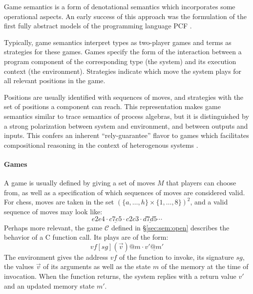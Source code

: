 \documentclass[sigplan,10pt,review,anonymous]{acmart}\settopmatter{printfolios=true,printccs=false,printacmref=false}
\begin{document}
Game semantics is a form of denotational semantics which
incorporates some operational aspects.
An early success of this approach was
the formulation of the first fully abstract models
of the programming language PCF \cite{pcfajm,pcfho}.

Typically,
game semantics interpret
types as two-player games
and terms as strategies for these games.
Games specify the form of the interaction
between a program component of the corresponding type
(the system)
and its execution context
(the environment).
Strategies
indicate which move the system plays
for all relevant positions in the game.

Positions are usually identified with sequences of moves,
and strategies with the set of positions
a component can reach.
This representation makes
game semantics similar to
trace semantics of process algebras,
but it is distinguished
by a strong polarization between
system and environment,
and between outputs and inputs.
This confers an inherent ``rely-guarantee'' flavor
to games which facilitates compositional reasoning
in the context of heterogenous systems \cite{cspgs}.


\paragraph{Games} \label{sec:mainideas:gs:games} %

A game is usually defined by giving a set of moves $M$
that players can choose from,
as well as a specification of which
sequences of moves are considered valid.
For chess,
moves are taken in the set $(\{a, \ldots, h\} \times \{1, \ldots, 8\})^2$,
and a valid sequence of moves may look like:
\[ e2e4 \cdot \underline{c7c5} \cdot c2c3 \cdot \underline{d7d5} \cdots \]
Perhaps more relevant,
the game $\mathcal{C}$ defined in \S\ref{sec:sem:open}
describes the behavior of a C function call.
Its plays are of the form:
\[ \mathit{vf}[\mathit{sg}](\vec{v})@m \cdot \underline{v'@m'} \]
The environment gives the address $\mathit{vf}$
of the function to invoke,
its signature $\mathit{sg}$,
the values $\vec{v}$ of its arguments
as well as the state $m$ of the memory
at the time of invocation.
When the function returns,
the system replies with
a return value $v'$
and an updated memory state $m'$.
\end{document}
